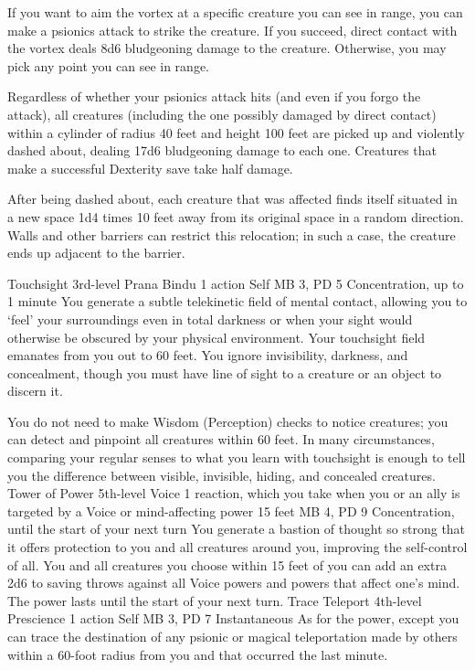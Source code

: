 If you want to aim the vortex at a specific creature you can
see in range, you can make a psionics attack to strike the
creature. If you succeed, direct contact with the vortex deals
8d6 bludgeoning damage to the creature. Otherwise, you may
pick any point you can see in range.

Regardless of whether your psionics attack hits (and even
if you forgo the attack), all creatures (including the one
possibly damaged by direct contact) within a cylinder of radius
40 feet and height 100 feet are picked up and violently dashed
about, dealing 17d6 bludgeoning damage to each one. Creatures
that make a successful Dexterity save take half damage.

After being dashed about, each creature that was affected
finds itself situated in a new space 1d4 times 10 feet away
from its original space in a random direction. Walls and other
barriers can restrict this relocation; in such a case, the
creature ends up adjacent to the barrier.

\DndPowerHeader%
    {Touchsight\label{pwr:touchsight}}
    {3rd-level Prana Bindu}
    {1 action}
    {Self}
    {MB 3, PD 5}
    {Concentration, up to 1 minute}
You generate a subtle telekinetic field of
mental contact, allowing you to `feel' your surroundings
even in total darkness or when your sight would otherwise
be obscured by your physical environment. Your touchsight
field emanates from you out to 60 feet. You ignore invisibility,
darkness, and concealment, though you must have line of sight
to a creature or an object to discern it.

You do not need to make Wisdom (Perception) checks to notice
creatures; you can detect and pinpoint all creatures within
60 feet. In many circumstances, comparing your regular senses
to what you learn with touchsight is enough to tell you the
difference between visible, invisible, hiding, and concealed
creatures.
\DndPowerHeader%
    {Tower of Power\label{pwr:tower_of_power}}
    {5th-level Voice}
    {1 reaction, which you take when you or an ally is targeted by a Voice or mind-affecting power}
    {15 feet}
    {MB 4, PD 9}
    {Concentration, until the start of your next turn}
You generate a bastion of thought so strong
that it offers protection to you and all creatures around
you, improving the self-control of all. You and all creatures
you choose within 15 feet of you can add an extra 2d6 to saving
throws against all Voice powers and powers that affect one's
mind. The power lasts until the start of your next turn.
\DndPowerHeader%
    {Trace Teleport\label{pwr:trace_teleport}}
    {4th-level Prescience}
    {1 action}
    {Self}
    {MB 3, PD 7}
    {Instantaneous}
As for the  power,
except you can trace the destination of any psionic or magical
teleportation made by others within a 60-foot radius from
you and that occurred the last minute.

